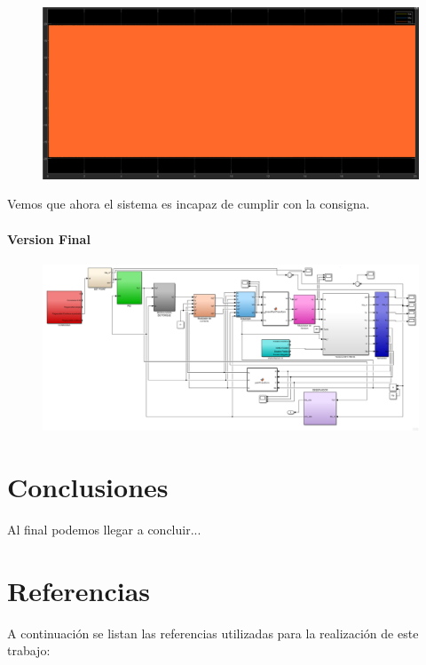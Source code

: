 \documentclass{article}
\begin{document}
\begin{figure}[H]
    \centering
    \includegraphics[width=1\textwidth]{5.2.5.e.4.png}
\end{figure}

Vemos que ahora el sistema es incapaz de cumplir con la consigna.


\subsection{Version Final}

\begin{figure}[H]
    \centering
    \includegraphics[width=1\textwidth]{5.2.6.png}
\end{figure}

\newpage

\part*{Conclusiones}

Al final podemos llegar a concluir...

\newpage

\part*{Referencias}

A continuación se listan las referencias utilizadas para la realización de este trabajo:


\label{LastPage}    
\end{document}
